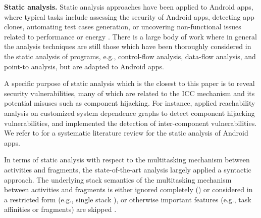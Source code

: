 
\noindent\textbf{Static analysis. }
%
Static analysis approaches have been applied to Android apps, where typical tasks include  %
assessing the security of Android apps, detecting app clones, automating test cases generation, or %
uncovering non-functional issues related to performance or energy \cite{LiBPRBOKT17}. There is a large body of work where in general the analysis techniques are still those which have been thoroughly considered in the static analysis of programs, e.g., control-flow analysis, data-flow analysis, and point-to analysis, but  are adapted to Android apps. 


A specific purpose of static analysis which is the closest to this paper is to reveal security vulnerabilities, many of which are related to the ICC mechanism and its potential misuses such as component hijacking. For instance,  \cite{LuLWLJ12} applied reachability analysis on customized system dependence graphs to detect component hijacking vulnerabilities, and \cite{OcteauMJBBKT13, OcteauLDJM15} implemented the detection of 
inter-component vulnerabilities. 
We refer to \cite{LiBPRBOKT17} for a systematic literature review for the static analysis of Android apps.

In terms of static analysis  with respect to the multitasking mechanism between activities and fragments, 
the state-of-the-art analysis largely
applied a syntactic approach. The underlying stack semantics of the multitasking mechanism  between activities and fragments is either ignored completely (\cite{AN13,LWX18,CHGD18}) or considered in a restricted form (e.g., single stack \cite{YZWWYR15}), or otherwise important features (e.g., task affinities or fragments) are skipped \cite{YZWWYR15,YWYZ17, ZSX18}.  

